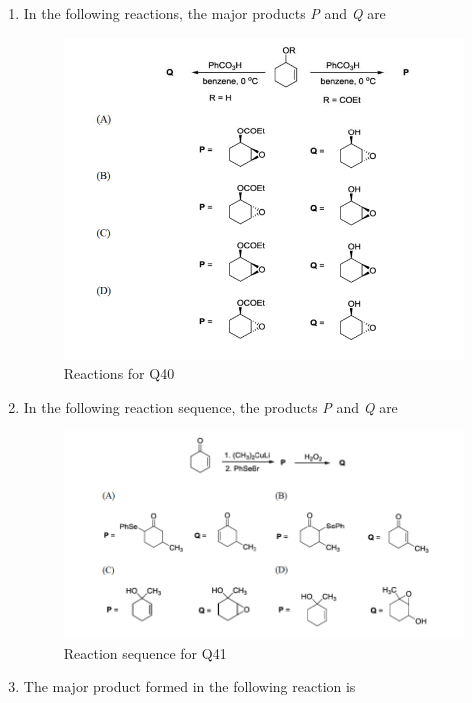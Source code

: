 \documentclass[journal,12pt,onecolumn]{IEEEtran}
\theoremstyle{remark}
\begin{document}
\begin{enumerate}
\item In the following reactions, the major products \textit{P} and \textit{Q} are \hfill{}

\begin{figure}[H]
    \centering
    \includegraphics[width=0.8\linewidth]{figs/image18.png}
    \caption{Reactions for Q40}
    \label{fig:q40}
\end{figure}

\item In the following reaction sequence, the products \textit{P} and \textit{Q} are \hfill{}

\begin{figure}[H]
    \centering
    \includegraphics[width=0.9\linewidth]{figs/image19.png}
    \caption{Reaction sequence for Q41}
    \label{fig:q41}
\end{figure}





\item The major product formed in the following reaction is \hfill{}


\end{enumerate}
\end{document}
